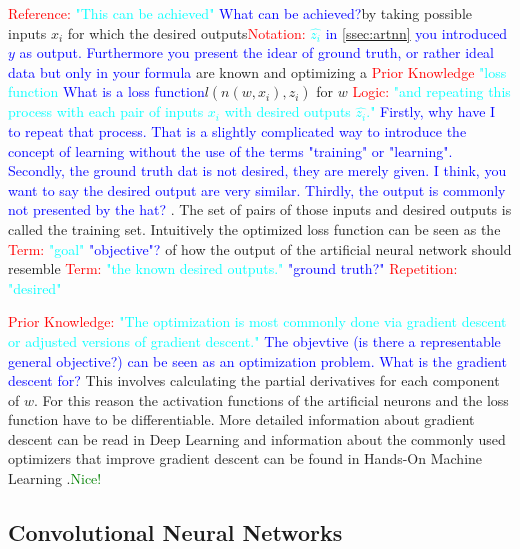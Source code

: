 \textcolor{red}{Reference:} \textcolor{cyan}{"This can be achieved"} \textcolor{blue}{What can be achieved?}by taking possible inputs $x_{i}$ for which the 
desired outputs\textcolor{red}{Notation:} \textcolor{cyan}{$\hat{z_{i}}$} \textcolor{blue}{in \ref{ssec:artnn} you introduced $y$ as output. Furthermore you present the idear of ground truth, or rather ideal data but only in your formula } are known and optimizing a \textcolor{red}{Prior Knowledge} \textcolor{cyan}{"loss function} \textcolor{blue}{What is a loss function}$l(n(w,x_{i}),\hat{z_{i}})$ for $w$
\textcolor{red}{Logic:} \textcolor{cyan}{"and repeating this process with each pair of inputs $x_{i}$ with desired outputs $\hat{z_{i}}$."} \textcolor{blue}{Firstly, why have I to repeat that process. That is a slightly complicated way to introduce the concept of learning without the use of the terms "training" or "learning". Secondly, the ground truth dat is not desired, they are merely given. I think, you want to say the desired output are very similar. Thirdly, the output is commonly not presented by the hat?  }. 
The set of pairs of
those inputs and desired outputs is called the training set. 
Intuitively the optimized loss function can be seen as the \textcolor{red}{Term:} \textcolor{cyan}{"goal"} \textcolor{blue}{"objective"?} of how the output of the artificial neural
network should resemble  \textcolor{red}{Term:} \textcolor{cyan}{"the known desired outputs."} \textcolor{blue}{"ground truth?"}  
\textcolor{red}{Repetition:} \textcolor{cyan}{"desired"} 

\textcolor{red}{Prior Knowledge:} \textcolor{cyan}{"The optimization is most commonly done via gradient descent or adjusted versions of gradient descent."} \textcolor{blue}{The objevtive (is there a representable general objective?) can be seen as an optimization problem. What is the gradient descent for?}
This involves calculating the partial derivatives for each component of $w$.
For this reason the activation functions of the artificial neurons and the loss function have to be
differentiable. More detailed information about gradient descent can be read in Deep Learning
\parencite{2016-goodfellow-deep} and information about the commonly used optimizers that improve 
gradient descent can be found in Hands-On Machine Learning \parencite{2017-geron-homl}.\textcolor{green}{Nice!}

\subsection{Convolutional Neural Networks}

